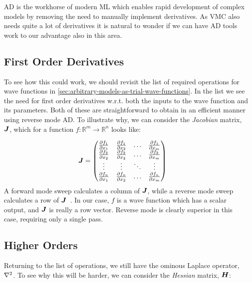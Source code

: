 \documentclass[Thesis.tex]{subfiles}
\begin{document}
AD is the workhorse of modern ML which enables rapid development of complex
models by removing the need to manually implement derivatives. As VMC also needs
quite a lot of derivatives it is natural to wonder if we can have AD tools work
to our advantage also in this area.

\subsection{First Order Derivatives}

To see how this could work, we should revisit the list of required operations
for wave functions in \cref{sec:arbitrary-models-as-trial-wave-functions}. In
the list we see the need for first order derivatives w.r.t. both the inputs to
the wave function and its parameters. Both of these are straightforward to
obtain in an efficient manner using reverse mode AD. To illustrate why, we can
consider the \emph{Jacobian} matrix, $\bm{J}$, which for a function
$f:\mathbb{R}^m\to\mathbb{R}^n$ looks like:

\begin{align}
  \bm{J} &=
  \begin{pmatrix}
    \pdv{f_1}{x_1} & \pdv{f_1}{x_2} & \dots & \pdv{f_1}{x_m}\\
    \pdv{f_2}{x_2} & \pdv{f_2}{x_2} & \dots & \pdv{f_2}{x_m}\\
    \vdots & \vdots & \ddots & \vdots\\
    \pdv{f_n}{x_1} & \pdv{f_n}{x_2} & \dots & \pdv{f_n}{x_m}\\
  \end{pmatrix}
\end{align}
A forward mode sweep calculates a column of $\bm{J}$,
while a reverse mode sweep calculates a row of $\bm{J}$~\cite{auto-diff-Berland}. In our case, $f$ is a wave function which has a
scalar output, and $\bm{J}$ is really a row vector. Reverse mode is clearly
superior in this case, requiring only a single pass.\\

\subsection{Higher Orders}

Returning to the list of operations, we still have the ominous Laplace
operator, $\laplacian$. To see why this will be harder, we can consider the
\emph{Hessian} matrix, $\bm{H}$:
\end{document}
